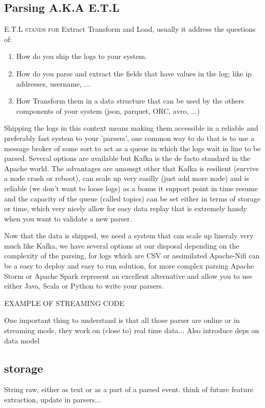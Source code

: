 \documentclass[a4paper,12pt]{article}
\begin{document}
{\subsection{Parsing A.K.A E.T.L}
\lettrine{E.T.L}{ stands for} Extract Transform and Load, usually it address the questions of:
\begin{enumerate}
	\item How do you ship the logs to your system.
	\item How do you parse and extract the fields that have values in the log; like ip addresses, username, ...
	\item How Transform them in a data structure that can be used by the others components of your system (json, parquet, ORC, avro, ...)
\end{enumerate}
Shipping the logs in this context means making them accessible in a reliable and preferably fast system to your 'parsers', one common way to do that is to use a 
message broker of some sort to act as a queue in which the logs wait in line to be parsed.
Several options are available but Kafka is the de facto standard in the Apache world.
The advantages are amonsgt other that Kafka is resilient (survive a node crash or reboot), can scale up very easilly (just add more node) and is reliable (we don't want to loose logs) as a bonus 
it support point in time resume and the capacity of the queue (called topics) can be set either in terms of storage or time, which very nicely allow for easy data replay that is extremely handy when you want to validate a new parser.

Now that the data is shipped, we need a system that can scale up lineraly very much like Kafka, we have several options at our disposal depending on the complexity of the parsing, for logs which are CSV or assimilated Apache-Nifi can be a easy to deploy and easy to run solution,
for more complex parsing Apache Storm or Apache Spark represent an excellent alternative and allow you to use either Java, Scala or Python to write your parsers.

EXAMPLE OF STREAMING CODE


One important thing to understand is that all those parser are online or in streaming mode, they work on (close to) real time data...
Also introduce deps on data model
\subsection{storage}
String raw, either as text or as a part of a parsed event. think of future feature extraction, update in parsers...
\newpage
}
\end{document}
